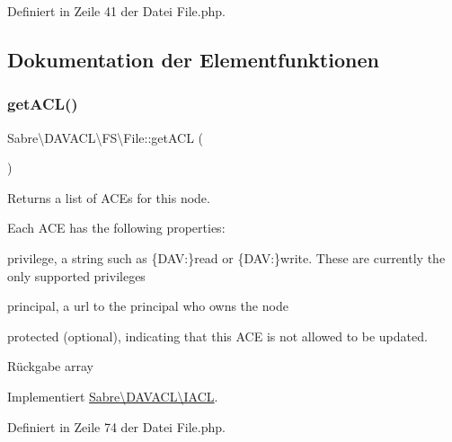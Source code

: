 Definiert in Zeile 41 der Datei File.\+php.



\subsection{Dokumentation der Elementfunktionen}
\mbox{\label{class_sabre_1_1_d_a_v_a_c_l_1_1_f_s_1_1_file_a68a29ed0ebbf5819e2958e7110a572da}} 
\subsubsection{\texorpdfstring{get\+A\+C\+L()}{getACL()}}
{\footnotesize\ttfamily Sabre\textbackslash{}\+D\+A\+V\+A\+C\+L\textbackslash{}\+F\+S\textbackslash{}\+File\+::get\+A\+CL (\begin{DoxyParamCaption}{ }\end{DoxyParamCaption})}

Returns a list of A\+CE\textquotesingle{}s for this node.

Each A\+CE has the following properties\+:
\begin{DoxyItemize}
\item \textquotesingle{}privilege\textquotesingle{}, a string such as \{D\+AV\+:\}read or \{D\+AV\+:\}write. These are currently the only supported privileges
\item \textquotesingle{}principal\textquotesingle{}, a url to the principal who owns the node
\item \textquotesingle{}protected\textquotesingle{} (optional), indicating that this A\+CE is not allowed to be updated.
\end{DoxyItemize}

\begin{DoxyReturn}{Rückgabe}
array 
\end{DoxyReturn}


Implementiert \mbox{\hyperlink{interface_sabre_1_1_d_a_v_a_c_l_1_1_i_a_c_l_a8fe3b3a5b48eae789d7eb722b340045c}{Sabre\textbackslash{}\+D\+A\+V\+A\+C\+L\textbackslash{}\+I\+A\+CL}}.



Definiert in Zeile 74 der Datei File.\+php.

